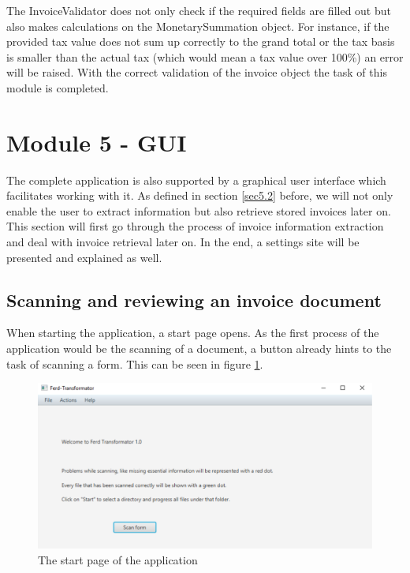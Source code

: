 The InvoiceValidator does not only check if the required fields are filled out but also makes calculations on the MonetarySummation object. For instance, if the provided tax value does not sum up correctly to the grand total or the tax basis is smaller than the actual tax (which would mean a tax value over 100\%) an error will be raised.
With the correct validation of the invoice object the task of this module is completed. 

\section{Module 5 - GUI}
\label{sec5.8}
The complete application is also supported by a graphical user interface which facilitates working with it.
As defined in section \ref{sec5.2} before, we will not only enable the user to extract information but also retrieve stored invoices later on. This section will first go through the process of invoice information extraction and deal with invoice retrieval later on. In the end, a settings site will be presented and explained as well.

\subsection{Scanning and reviewing an invoice document}
\label{sec5.8.1}

When starting the application, a start page opens. As the first process of the application would be the scanning of a document, a button already hints to the task of scanning a form. This can be seen in figure \ref{startmenu}.

\begin{figure}[ht!]
\centering
\includegraphics[scale=0.6,natwidth=277,natheight=137]{Images/GUI/startmenu.pdf}
\caption{The start page of the application \label{startmenu}}
\end{figure}

